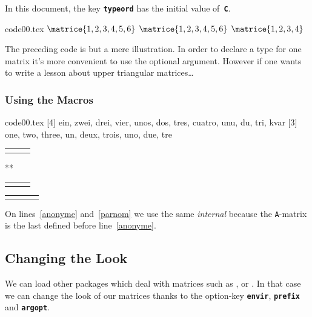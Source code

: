 \documentclass[full]{l3doc}
\newcommand{\MacroPres}[2]{\textcolor{#1}{\textbf{\cs{#2}}}}
\newcommand{\csprint}{\MacroPres{cmdcausante}}
\newcommand{\ObjetPres}[2]{\textcolor{#1}{\textbf{\texttt{#2}}}}
\newcommand{\keyname}{\ObjetPres{keycolor}}
\newcommand{\TypeMat}{\ObjetPres{keyword30}}
\newcommand{\UnExemple}{%
  \par \medskip \par \noindent
  \begin{minipage}[c]{0.66\linewidth}
    
  \end{minipage}
  \hspace{\stretch{1}}
  \begin{minipage}[c]{0.32\linewidth}
    \small
    
  \end{minipage}
  \par \medbreak}
\begin{document}
In this document, the key \keyname{typeord} has the initial value of~\TypeMat{C}.


\medskip{}

\begin{VerbatimOut}[gobble=0]{code00.tex}
$\matrice{1, 2, 3, 4, 5, 6}$\quad
{}
$\matrice{1, 2, 3, 4, 5, 6}$\quad
{}
$\matrice{1, 2, 3, 4}$
\end{VerbatimOut}
\UnExemple{}

The preceding code is but a mere illustration. In order to declare a type for
one matrix it's more convenient to use the optional argument. However if one
wants to write a lesson about upper triangular matrices\dots{}

\subsubsection{Using the \csprint{(La)MatriceInterieur} Macros}
\label{sec:matint}

\begin{VerbatimOut}[gobble=0]{code00.tex}
[4]{
 \hline ein, zwei, drei, vier,
 \hline unos, dos, tres, cuatro,
 \hline unu, du, tri, kvar}%
[3]{
 one, two, three,
 un, deux, trois,
 uno, due, tre}%
\begin{tabular}{*{3}{l}}
  \MatriceInterieur %
\end{tabular}
\par \bigskip *** \par \bigskip
\begin{tabular}{*{3}{l}}
  \LaMatriceInterieur{A} %
\end{tabular}
\par \bigskip
\begin{tabular}{|*{4}{l|}}
  \LaMatriceInterieur{B}\hline
\end{tabular}
\end{VerbatimOut}
\UnExemple{}

On lines~\ref{anonyme} and~\ref{parnom} we use the same \emph{internal} because
the \texttt{A}-matrix is the last defined before line~\ref{anonyme}.

\subsection{Changing the Look}
\label{sec:changelook}

We can load other packages which deal with matrices such as ,
 or . In that case we can change the look of our
matrices thanks to the option-key \keyname{envir}, \keyname{prefix} and
\keyname{argopt}.
\end{document}
